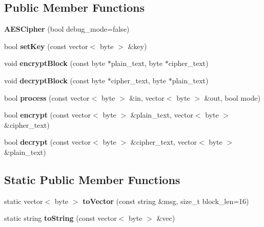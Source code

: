 \subsection*{Public Member Functions}
\begin{DoxyCompactItemize}
\item 
\mbox{\label{classAESCipher_a6356fad966558b8f7219d3a20b9a7656}} 
{\bfseries A\+E\+S\+Cipher} (bool debug\+\_\+mode=false)
\item 
\mbox{\label{classAESCipher_aa0a48f50b134d4b23b48d147cbb9c395}} 
bool {\bfseries set\+Key} (const vector$<$ byte $>$ \&key)
\item 
\mbox{\label{classAESCipher_af580c4fbade685bca77953f9600c98f3}} 
void {\bfseries encrypt\+Block} (const byte $\ast$plain\+\_\+text, byte $\ast$cipher\+\_\+text)
\item 
\mbox{\label{classAESCipher_af0503d3a0ce1090ddb8d0a4ef7ebbe0b}} 
void {\bfseries decrypt\+Block} (const byte $\ast$cipher\+\_\+text, byte $\ast$plain\+\_\+text)
\item 
\mbox{\label{classAESCipher_a6bacb932c48a04c050921ce343018eb5}} 
bool {\bfseries process} (const vector$<$ byte $>$ \&in, vector$<$ byte $>$ \&out, bool mode)
\item 
\mbox{\label{classAESCipher_a7bdb3f04dd3c3ee3d286a5c8b3891ea1}} 
bool {\bfseries encrypt} (const vector$<$ byte $>$ \&plain\+\_\+text, vector$<$ byte $>$ \&cipher\+\_\+text)
\item 
\mbox{\label{classAESCipher_a51736a7005168423ddee6c07ea3b59a7}} 
bool {\bfseries decrypt} (const vector$<$ byte $>$ \&cipher\+\_\+text, vector$<$ byte $>$ \&plain\+\_\+text)
\end{DoxyCompactItemize}
\subsection*{Static Public Member Functions}
\begin{DoxyCompactItemize}
\item 
\mbox{\label{classAESCipher_a239e44d62202daa71deb4a212f265033}} 
static vector$<$ byte $>$ {\bfseries to\+Vector} (const string \&msg, size\+\_\+t block\+\_\+len=16)
\item 
\mbox{\label{classAESCipher_ade366941f98c89b610588ab769ad24fa}} 
static string {\bfseries to\+String} (const vector$<$ byte $>$ \&vec)
\end{DoxyCompactItemize}
